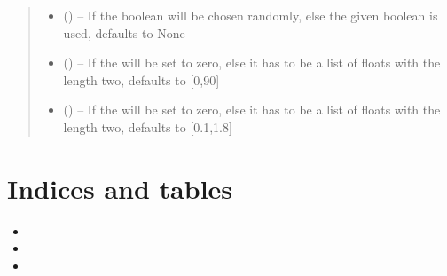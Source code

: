 \documentclass[letterpaper,10pt,english]{sphinxmanual}
\begin{document}
\begin{fulllineitems}
\begin{fulllineitems}
\begin{quote}
\begin{description}
\begin{itemize}
\item {} 
 (\sphinxstyleliteralemphasis{\sphinxupquote{, }}) -- If  the boolean will be chosen randomly, else the given boolean is used, defaults to None

\item {} 
 (\sphinxstyleliteralemphasis{\sphinxupquote{, }}) -- If  the  will be set to zero, else it has to be a list of floats with the length two, defaults to {[}0,90{]}

\item {} 
 (\sphinxstyleliteralemphasis{\sphinxupquote{, }}) -- If  the  will be set to zero, else it has to be a list of floats with the length two, defaults to {[}0.1,1.8{]}

\end{itemize}

\end{description}\end{quote}

\end{fulllineitems}


\end{fulllineitems}



\chapter{Indices and tables}
\label{\detokenize{index:indices-and-tables}}\begin{itemize}
\item {} 

\item {} 

\item {} 

\end{itemize}



\renewcommand{\indexname}{Index}
\printindex
\end{document}
